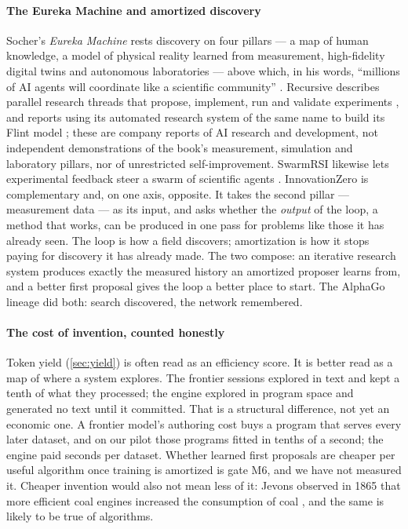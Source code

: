 \paragraph{The Eureka Machine and amortized discovery} Socher's \emph{Eureka Machine}
\citep{socher2026eureka} rests discovery on four pillars --- a map of human knowledge, a model of
physical reality learned from measurement, high-fidelity digital twins and autonomous laboratories
--- above which, in his words, ``millions of AI agents will coordinate like a scientific community''
\citep{socher2026bookbite}. Recursive describes parallel research threads that propose, implement,
run and validate experiments \citep{recursive2026firststeps}, and reports using its automated
research system of the same name to build its Flint model \citep{recursive2026flint}; these are
company reports of AI research and development, not independent demonstrations of the book's
measurement, simulation and laboratory pillars, nor of unrestricted self-improvement. SwarmRSI
likewise lets experimental feedback steer a swarm of scientific agents \citep{meng2026swarmrsi}. InnovationZero is
complementary and, on one axis, opposite. It takes the second pillar --- measurement data --- as its
input, and asks whether the \emph{output} of the loop, a method that works, can be produced in one
pass for problems like those it has already seen. The loop is how a field discovers; amortization is
how it stops paying for discovery it has already made. The two compose: an iterative research
system produces exactly the measured history an amortized proposer learns from, and a better first
proposal gives the loop a better place to start. The AlphaGo lineage did both: search discovered,
the network remembered.

\paragraph{The cost of invention, counted honestly} Token yield (\cref{sec:yield}) is often read as an
efficiency score. It is better read as a map of where a system explores. The frontier sessions
explored in text and kept a tenth of what they processed; the engine explored in program space and
generated no text until it committed. That is a structural difference, not yet an economic one. A
frontier model's authoring cost buys a program that serves every later dataset, and on our pilot
those programs fitted in tenths of a second; the engine paid seconds per dataset. Whether learned
first proposals are cheaper per useful algorithm once training is amortized is gate M6, and we have
not measured it. Cheaper invention would also not mean less of it: Jevons observed in 1865 that more
efficient coal engines increased the consumption of coal \citep{jevons1865}, and the same is likely
to be true of algorithms.

